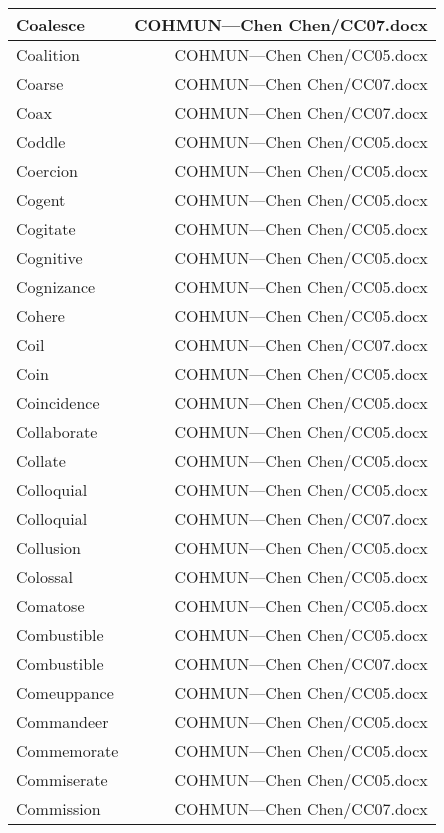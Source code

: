 \documentclass{article}
\begin{document}
\begin{center}
\begin{longtable}{|l|r|}
\hline
Coalesce  &  COHMUN---Chen Chen/CC07.docx\\  
\hline
Coalition  &  COHMUN---Chen Chen/CC05.docx\\  
\hline
Coarse  &  COHMUN---Chen Chen/CC07.docx\\  
\hline
Coax  &  COHMUN---Chen Chen/CC07.docx\\  
\hline
Coddle  &  COHMUN---Chen Chen/CC05.docx\\  
\hline
Coercion  &  COHMUN---Chen Chen/CC05.docx\\  
\hline
Cogent  &  COHMUN---Chen Chen/CC05.docx\\  
\hline
Cogitate  &  COHMUN---Chen Chen/CC05.docx\\  
\hline
Cognitive  &  COHMUN---Chen Chen/CC05.docx\\  
\hline
Cognizance  &  COHMUN---Chen Chen/CC05.docx\\  
\hline
Cohere  &  COHMUN---Chen Chen/CC05.docx\\  
\hline
Coil  &  COHMUN---Chen Chen/CC07.docx\\  
\hline
Coin  &  COHMUN---Chen Chen/CC05.docx\\  
\hline
Coincidence  &  COHMUN---Chen Chen/CC05.docx\\  
\hline
Collaborate  &  COHMUN---Chen Chen/CC05.docx\\  
\hline
Collate  &  COHMUN---Chen Chen/CC05.docx\\  
\hline
Colloquial  &  COHMUN---Chen Chen/CC05.docx\\  
\hline
Colloquial  &  COHMUN---Chen Chen/CC07.docx\\  
\hline
Collusion  &  COHMUN---Chen Chen/CC05.docx\\  
\hline
Colossal  &  COHMUN---Chen Chen/CC05.docx\\  
\hline
Comatose  &  COHMUN---Chen Chen/CC05.docx\\  
\hline
Combustible  &  COHMUN---Chen Chen/CC05.docx\\  
\hline
Combustible  &  COHMUN---Chen Chen/CC07.docx\\  
\hline
Comeuppance  &  COHMUN---Chen Chen/CC05.docx\\  
\hline
Commandeer  &  COHMUN---Chen Chen/CC05.docx\\  
\hline
Commemorate  &  COHMUN---Chen Chen/CC05.docx\\  
\hline
Commiserate  &  COHMUN---Chen Chen/CC05.docx\\  
\hline
Commission  &  COHMUN---Chen Chen/CC07.docx\\  

\end{longtable}
\end{center}
\end{document}
